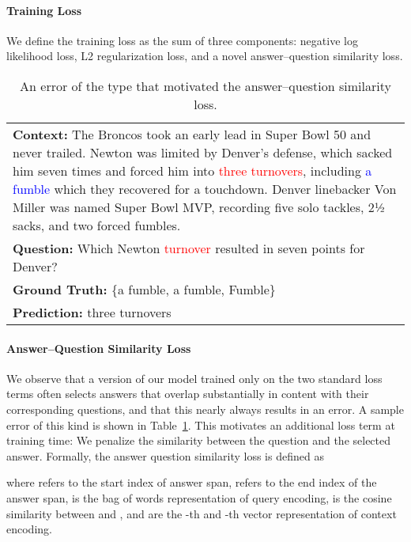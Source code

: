 \documentclass[11pt,letterpaper]{article}
\begin{document}
\paragraph{Training Loss} We define the training loss as the sum of three components: negative log likelihood loss,  L2 regularization loss, and a novel answer--question similarity loss.

\begin{table}
\centering
\begin{tabular}{p{}}
\toprule
\textbf{Context:}
The Broncos took an early lead in Super Bowl 50 and never
trailed. Newton was limited by Denver's defense, which
sacked him seven times and forced him into \textcolor{red}{three turnovers}, 
including \textcolor{blue}{a fumble} which they recovered for a touchdown. 
Denver linebacker Von Miller was named Super Bowl MVP, 
recording five solo tackles, 2½ sacks, and two forced 
fumbles. 
\\
\vspace{-0.1em}
\textbf{Question:}
Which Newton \textcolor{red}{turnover} resulted in seven points for Denver?\\
\vspace{-0.1em}
\textbf{Ground Truth:} \{a fumble,
a fumble,
Fumble\}\\
\vspace{-0.1em}
\textbf{Prediction:}
three turnovers\\
\bottomrule
\end{tabular}

\caption{An error of the type that motivated the answer--question similarity loss.}\label{tab:AQS_sample}
\end{table}

\paragraph{Answer--Question Similarity Loss} We observe that a version of our model trained only on the two standard loss terms often selects answers that overlap substantially in content with their corresponding questions, and that this nearly always results in an error. A sample error of this kind is shown in Table~\ref{tab:AQS_sample}. This motivates an additional loss term at training time: We penalize the similarity between the question and the selected answer. Formally, the answer question similarity loss is defined as




 

where  refers to the start index of answer span,  refers to the end index of the answer span,  is the bag of words representation of query encoding,  is the cosine similarity between  and ,  and  are the -th and -th vector representation of context encoding.
\end{document}
